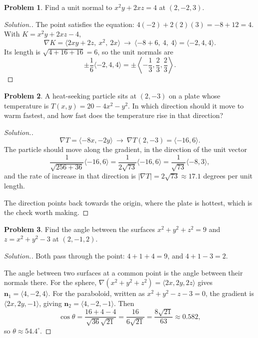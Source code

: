 \documentclass[11pt,a4paper]{article}
\theoremstyle{definition}
\newtheorem{problemx}{Problem}[subsection]
\newenvironment{problem}{\begin{problemx}}{\end{problemx}}
\newenvironment{solution}
  {\renewcommand{\qedsymbol}{}\begin{proof}[\textit{Solution}.]}
  {\end{proof}}
\begin{document}
\begin{problem}
Find a unit normal to $x^2y+2xz = 4$ at $(2,-2,3)$.
\end{problem}
\begin{solution}
The point satisfies the equation: $4(-2)+2(2)(3) = -8+12 = 4$. With
$K = x^2y+2xz-4$,
\[\nabla K = \langle 2xy+2z,\ x^2,\ 2x\rangle
\ \longrightarrow\ \langle -8+6,\ 4,\ 4\rangle = \langle -2, 4, 4\rangle .\]
Its length is $\sqrt{4+16+16} = 6$, so the unit normals are
\[\pm\frac{1}{6}\langle -2,4,4\rangle
= \pm\left\langle -\frac13, \frac23, \frac23\right\rangle .\]
\end{solution}

\begin{problem}
A heat-seeking particle sits at $(2,-3)$ on a plate whose temperature is
$T(x,y) = 20-4x^2-y^2$. In which direction should it move to warm fastest, and
how fast does the temperature rise in that direction?
\end{problem}
\begin{solution}
\[\nabla T = \langle -8x, -2y\rangle
\ \longrightarrow\ \nabla T(2,-3) = \langle -16, 6\rangle .\]
The particle should move along the gradient, in the direction of the unit vector
\[\frac{1}{\sqrt{256+36}}\langle -16, 6\rangle
= \frac{1}{2\sqrt{73}}\langle -16, 6\rangle
= \frac{1}{\sqrt{73}}\langle -8, 3\rangle ,\]
and the rate of increase in that direction is
$\left|\nabla T\right| = 2\sqrt{73}\approx 17.1$ degrees per unit length.

The direction points back towards the origin, where the plate is hottest, which
is the check worth making.
\end{solution}

\begin{problem}
Find the angle between the surfaces $x^2+y^2+z^2 = 9$ and $z = x^2+y^2-3$ at
$(2,-1,2)$.
\end{problem}
\begin{solution}
Both pass through the point: $4+1+4 = 9$, and $4+1-3 = 2$.

The angle between two surfaces at a common point is the angle between their
normals there. For the sphere, $\nabla(x^2+y^2+z^2) = \langle 2x,2y,2z\rangle$
gives $\mathbf{n}_1 = \langle 4,-2,4\rangle$. For the paraboloid, written as
$x^2+y^2-z-3 = 0$, the gradient is $\langle 2x,2y,-1\rangle$, giving
$\mathbf{n}_2 = \langle 4,-2,-1\rangle$. Then
\[\cos\theta
= \frac{16+4-4}{\sqrt{36}\sqrt{21}} = \frac{16}{6\sqrt{21}}
= \frac{8\sqrt{21}}{63}\approx 0.582 ,\]
so $\theta\approx 54.4^{\circ}$.
\end{solution}
\end{document}
